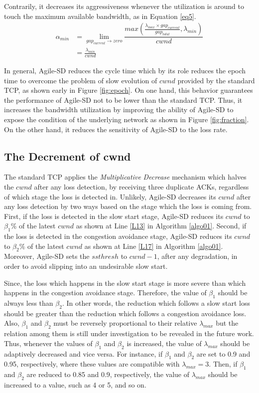 \documentclass[preprint,3p,times,twocolumn,authoryear]{elsarticle}
\begin{document}
Contrarily, it decreases its aggressiveness whenever the utilization is around to touch the maximum available bandwidth, as in Equation \eqref{eq5}. 
\begin{align}
\alpha_{min} &= \lim_{gap_{current} \to zero}  \dfrac{max\left( \frac{\lambda_{max} \times gap_{current}}{gap_{total}}, \lambda_{min}\right)} {cwnd}\label{eq5}\\
&= \frac{\lambda_{min}}{cwnd} \nonumber
\end{align}

In general, Agile-SD reduces the cycle time which by its role reduces the epoch time to overcome the problem of slow evolution of $cwnd$ provided by the standard TCP, as shown early in Figure \ref{fig:epoch}. On one hand, this behavior guarantees the performance of Agile-SD not to be lower than the standard TCP. Thus, it increases the bandwidth utilization by improving the ability of Agile-SD to expose the condition of the underlying network as shown in Figure \ref{fig:fraction}. On the other hand, it reduces the sensitivity of Agile-SD to the loss rate.

\subsection{The Decrement of cwnd}

The standard TCP applies the \textit{Multiplicative} \textit{Decrease} mechanism which halves the $cwnd$ after any loss detection, by receiving three duplicate ACKs, regardless of which stage the loss is detected in. Unlikely, Agile-SD decreases its $cwnd$ after any loss detection by two ways based on the stage which the loss is coming from. First, if the loss is detected in the slow start stage, Agile-SD reduces its $cwnd$ to $\beta_1\%$ of the latest $cwnd$ as shown at Line \ref{L13} in Algorithm \ref{algo01}. Second, if the loss is detected in the congestion avoidance stage, Agile-SD reduces its $cwnd$ to $\beta_2\%$ of the latest $cwnd$  as shown at Line \ref{L17} in Algorithm \ref{algo01}. Moreover, Agile-SD sets the $ssthresh$ to $cwnd - 1$, after any degradation, in order to avoid slipping into an undesirable slow start.

Since, the loss which happens in the slow start stage is more severe than which happens in the congestion avoidance stage. Therefore, the value of $\beta_1$ should be always less than $\beta_2$. In other words, the reduction which follows a slow start loss should be greater than the reduction which follows a congestion avoidance loss. Also, $\beta_1$ and $\beta_2$ must be reversely proportional to their relative $\lambda_{max}$ but the relation among them is still under investigation to be revealed in the future work. Thus, whenever the values of $\beta_1$ and $\beta_2$ is increased, the value of $\lambda_{max}$ should be adaptively decreased and vice versa. For instance, if $\beta_1$ and $\beta_2$ are set to 0.9 and 0.95, respectively, where these values are compatible with $\lambda_{max} = 3$. Then, if $\beta_1$ and $\beta_2$ are reduced to 0.85 and 0.9, respectively, the value of $\lambda_{max}$ should be increased to a value, such as 4 or 5, and so on.
\end{document}
